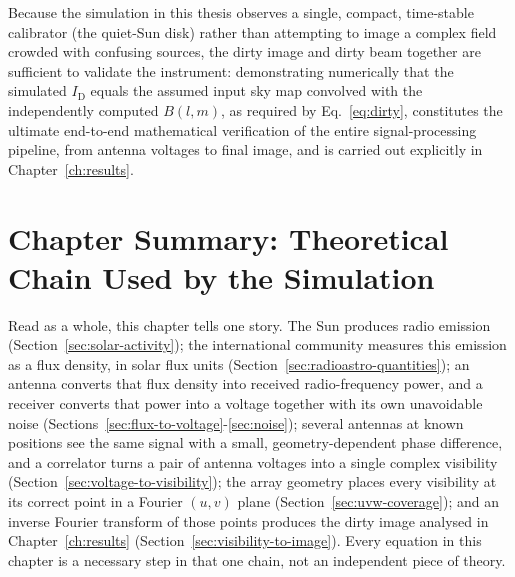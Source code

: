 Because the simulation in this thesis observes a single, compact, time-stable
calibrator (the quiet-Sun disk) rather than attempting to image a complex
field crowded with confusing sources, the dirty image and dirty beam together
are sufficient to validate the instrument: demonstrating numerically that the
simulated $I_\mathrm{D}$ equals the assumed input sky map convolved with the
independently computed $B(l,m)$, as required by Eq.~\eqref{eq:dirty},
constitutes the ultimate end-to-end mathematical verification of the entire
signal-processing pipeline, from antenna voltages to final image, and is
carried out explicitly in Chapter~\ref{ch:results}.

\section{Chapter Summary: Theoretical Chain Used by the Simulation}
\label{sec:chapter-summary}
Read as a whole, this chapter tells one story. The Sun produces radio
emission (Section~\ref{sec:solar-activity}); the international community
measures this emission as a flux density, in solar flux units
(Section~\ref{sec:radioastro-quantities}); an antenna converts that flux
density into received radio-frequency power, and a receiver converts that
power into a voltage together with its own unavoidable noise
(Sections~\ref{sec:flux-to-voltage}-\ref{sec:noise}); several antennas at
known positions see the same signal with a small, geometry-dependent phase
difference, and a correlator turns a pair of antenna voltages into a single
complex visibility (Section~\ref{sec:voltage-to-visibility}); the array
geometry places every visibility at its correct point in a Fourier $(u,v)$
plane (Section~\ref{sec:uvw-coverage}); and an inverse Fourier transform of
those points produces the dirty image analysed in Chapter~\ref{ch:results}
(Section~\ref{sec:visibility-to-image}). Every equation in this chapter is a
necessary step in that one chain, not an independent piece of theory.

